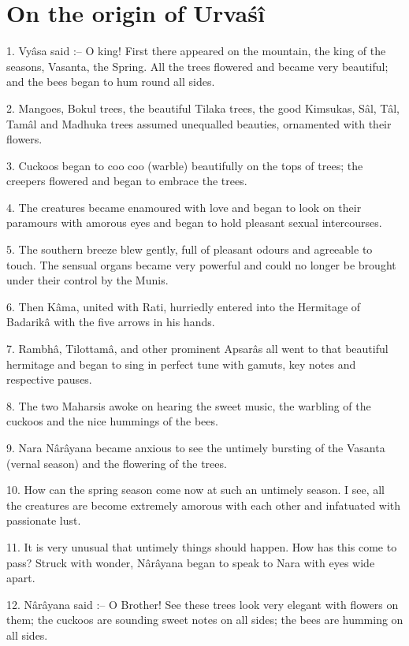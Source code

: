 ﻿\chapter{On the origin of Urva\'s\^i}

1. Vy\^asa said :-- O king! First there appeared on the mountain, the king of the seasons, Vasanta, the Spring. All the trees flowered and became very beautiful; and the bees began to hum round all sides.

2. Mangoes, Bokul trees, the beautiful Tilaka trees, the good Kimsukas, S\^al, T\^al, Tam\^al and Madhuka trees assumed unequalled beauties, ornamented with their flowers.

3. Cuckoos began to coo coo (warble) beautifully on the tops of trees; the creepers flowered and began to embrace the trees.

4. The creatures became enamoured with love and began to look on their paramours with amorous eyes and began to hold pleasant sexual intercourses.

5. The southern breeze blew gently, full of pleasant odours and agreeable to touch. The sensual organs became very powerful and could no longer be brought under their control by the Munis.

6. Then K\^ama, united with Rati, hurriedly entered into the Hermitage of Badarik\^a with the five arrows in his hands.

7. Rambh\^a, Tilottam\^a, and other prominent Apsar\^as all went to that beautiful hermitage and began to sing in perfect tune with gamuts, key notes and respective pauses.

8. The two Maharsis awoke on hearing the sweet music, the warbling of the cuckoos and the nice hummings of the bees.

9. Nara N\^ar\^ayana became anxious to see the untimely bursting of the Vasanta (vernal season) and the flowering of the trees.

10. How can the spring season come now at such an untimely season. I see, all the creatures are become extremely amorous with each other and infatuated with passionate lust.

11. It is very unusual that untimely things should happen. How has this come to pass? Struck with wonder, N\^ar\^ayana began to speak to Nara with eyes wide apart.

12. N\^ar\^ayana said :-- O Brother! See these trees look very elegant with flowers on them; the cuckoos are sounding sweet notes on all sides; the bees are humming on all sides.

